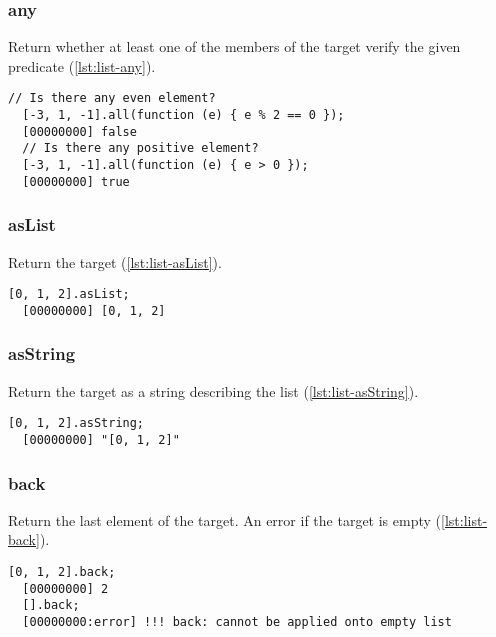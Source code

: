 \subsubsection{any}

Return whether at least one of the members of the target verify the
given predicate (\autoref{lst:list-any}).

\begin{lstlisting}[caption=List.any, label=lst:list-any, float=\floatposh]
  // Is there any even element?
  [-3, 1, -1].all(function (e) { e % 2 == 0 });
  [00000000] false
  // Is there any positive element?
  [-3, 1, -1].all(function (e) { e > 0 });
  [00000000] true
\end{lstlisting}

\subsubsection{asList}

Return the target (\autoref{lst:list-asList}).

\begin{lstlisting}[caption=List.asList, label=lst:list-asList, float=\floatposh]
  [0, 1, 2].asList;
  [00000000] [0, 1, 2]
\end{lstlisting}

\subsubsection{asString}

Return the target as a string describing the list
(\autoref{lst:list-asString}).

\begin{lstlisting}[caption=List.asString, label=lst:list-asString, float=\floatposh]
  [0, 1, 2].asString;
  [00000000] "[0, 1, 2]"
\end{lstlisting}

\subsubsection{back}

Return the last element of the target. An error if the target is empty
(\autoref{lst:list-back}).

\begin{lstlisting}[caption=List.back, label=lst:list-back, float=\floatposh]
  [0, 1, 2].back;
  [00000000] 2
  [].back;
  [00000000:error] !!! back: cannot be applied onto empty list
\end{lstlisting}

